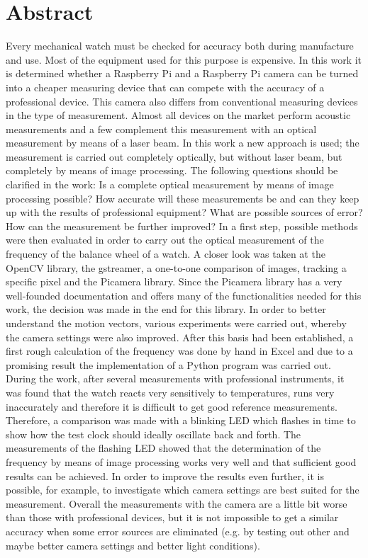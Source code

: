 \documentclass[12pt, a4paper]{report}
\begin{document}
\chapter*{Abstract}
Every mechanical watch must be checked for accuracy both during manufacture and use. Most of the equipment used for this purpose is expensive. In this work it is determined whether a Raspberry Pi and a Raspberry Pi camera can be turned into a cheaper measuring device that can compete with the accuracy of a professional device. This camera also differs from conventional measuring devices in the type of measurement. Almost all devices on the market perform acoustic measurements and a few complement this measurement with an optical measurement by means of a laser beam. In this work a new approach is used; the measurement is carried out completely optically, but without laser beam, but completely by means of image processing. 
\newline
The following questions should be clarified in the work: Is a complete optical measurement by means of image processing possible? How accurate will these measurements be and can they keep up with the results of professional equipment? What are possible sources of error? How can the measurement be further improved? 
\newline
In a first step, possible methods were then evaluated in order to carry out the optical measurement of the frequency of the balance wheel of a watch. A closer look was taken at the OpenCV library, the gstreamer, a one-to-one comparison of images, tracking a specific pixel and the Picamera library. Since the Picamera library has a very well-founded documentation and offers many of the functionalities needed for this work, the decision was made in the end for this library. In order to better understand the motion vectors, various experiments were carried out, whereby the camera settings were also improved. After this basis had been established, a first rough calculation of the frequency was done by hand in Excel and due to a promising result the implementation of a Python program was carried out. During the work, after several measurements with professional instruments, it was found that the watch reacts very sensitively to temperatures, runs very inaccurately and therefore it is difficult to get good reference measurements. Therefore, a comparison was made with a blinking LED which flashes in time to show how the test clock should ideally oscillate back and forth. The measurements of the flashing LED showed that the determination of the frequency by means of image processing works very well and that sufficient good results can be achieved. In order to improve the results even further, it is possible, for example, to investigate which camera settings are best suited for the measurement. 
Overall the measurements with the camera are a little bit worse than those with professional devices, but it is not impossible to get a similar accuracy when some error sources are eliminated (e.g. by testing out other and maybe better camera settings and better light conditions).
\end{document}
